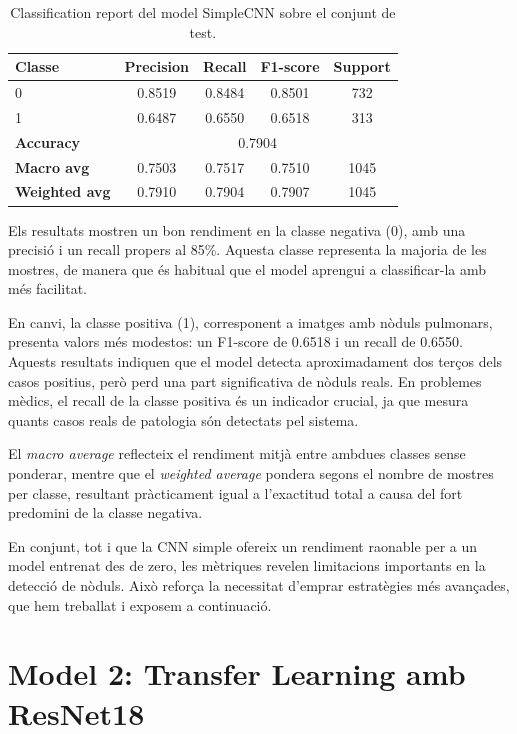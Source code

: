 \documentclass[12pt,a4paper]{article}
\begin{document}
\begin{table}[h!]
\centering
\begin{tabular}{l|c|c|c|c}
\hline
\textbf{Classe} & \textbf{Precision} & \textbf{Recall} & \textbf{F1-score} & \textbf{Support} \\
\hline
0 & 0.8519 & 0.8484 & 0.8501 & 732 \\
1 & 0.6487 & 0.6550 & 0.6518 & 313 \\
\hline
\textbf{Accuracy} & \multicolumn{4}{c}{0.7904} \\
\textbf{Macro avg} & 0.7503 & 0.7517 & 0.7510 & 1045 \\
\textbf{Weighted avg} & 0.7910 & 0.7904 & 0.7907 & 1045 \\
\hline
\end{tabular}
\caption{Classification report del model SimpleCNN sobre el conjunt de test.}
\label{tab:classification_report_simplecnn}
\end{table}

Els resultats mostren un bon rendiment en la classe negativa (0), amb una precisió i un
recall propers al 85\%. Aquesta classe representa la majoria de les mostres, de manera
que és habitual que el model aprengui a classificar-la amb més facilitat.

En canvi, la classe positiva (1), corresponent a imatges amb nòduls pulmonars, presenta
valors més modestos: un F1-score de 0.6518 i un recall de 0.6550. Aquests resultats
indiquen que el model detecta aproximadament dos terços dels casos positius, però perd
una part significativa de nòduls reals. En problemes mèdics, el recall de la classe
positiva és un indicador crucial, ja que mesura quants casos reals de patologia són
detectats pel sistema.

El \textit{macro average} reflecteix el rendiment mitjà entre ambdues classes sense
ponderar, mentre que el \textit{weighted average} pondera segons el nombre de mostres
per classe, resultant pràcticament igual a l’exactitud total a causa del fort
predomini de la classe negativa.

En conjunt, tot i que la CNN simple ofereix un rendiment raonable per a un model
entrenat des de zero, les mètriques revelen limitacions importants en la detecció de
nòduls. Això reforça la necessitat d’emprar estratègies més avançades, que hem treballat
i exposem a continuació.


\section{Model 2: Transfer Learning amb ResNet18}
\end{document}
